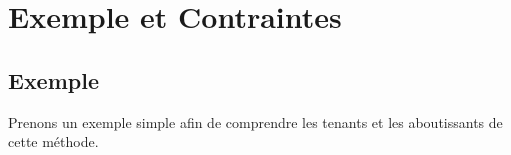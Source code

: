 \documentclass[12pt, a4paper]{memoir}
\newcommand{\dbarre}{\overline{\mathcal{D}}}
\begin{document}
%    
%    
%    
% 
%  
% 
% 


\section{Exemple et Contraintes}

\subsection{Exemple}

Prenons un exemple simple afin de comprendre les tenants et les aboutissants de cette méthode.
\end{document}
